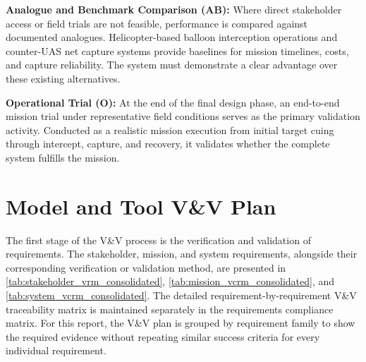 \textbf{Analogue and Benchmark Comparison (AB): }Where direct stakeholder access or field trials are not feasible, performance is compared against documented analogues. Helicopter-based balloon interception operations and counter-UAS net capture systems provide baselines for mission timelines, costs, and capture reliability. The system must demonstrate a clear advantage over these existing alternatives.

\textbf{Operational Trial (O): }At the end of the final design phase, an end-to-end mission trial under representative field conditions serves as the primary validation activity. Conducted as a realistic mission execution from initial target cuing through intercept, capture, and recovery, it validates whether the complete system fulfills the mission.

\section{Model and Tool V\&V Plan}
\label{sec:model_tool_vv_plan}
\label{sec:Missplan}

The first stage of the V\&V process is the verification and validation of requirements. The stakeholder, mission, and system requirements, alongside their corresponding verification or validation method, are presented in \autoref{tab:stakeholder_vrm_consolidated}, \autoref{tab:mission_vcrm_consolidated}, and \autoref{tab:system_vcrm_consolidated}. The detailed requirement-by-requirement V\&V traceability matrix is maintained separately in the requirements compliance matrix. For this report, the V\&V plan is grouped by requirement family to show the required evidence without repeating similar success criteria for every individual requirement.




